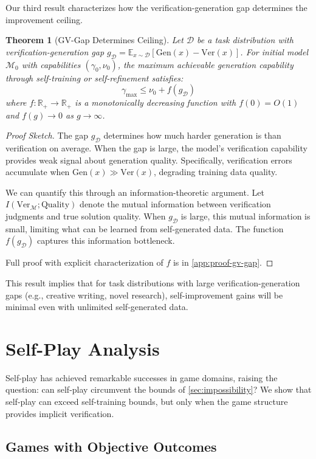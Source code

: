 \documentclass{article}
\newtheorem{theorem}{Theorem}
\theoremstyle{definition}
\theoremstyle{remark}
\newcommand{\M}{\mathcal{M}}  %
\newcommand{\D}{\mathcal{D}}  %
\newcommand{\Gen}{\text{Gen}}  %
\newcommand{\Ver}{\text{Ver}}  %
\newcommand{\E}{\mathbb{E}}    %
\newcommand{\R}{\mathbb{R}}    %
\begin{document}
Our third result characterizes how the verification-generation gap determines the improvement ceiling.

\begin{theorem}[GV-Gap Determines Ceiling]
\label{thm:gv-gap}
Let \(\D\) be a task distribution with verification-generation gap \(g_\D = \E_{x \sim \D}[\Gen(x) - \Ver(x)]\). For initial model \(\M_0\) with capabilities \((\gamma_0, \nu_0)\), the maximum achievable generation capability through self-training or self-refinement satisfies:
\[
\gamma_{\max} \leq \nu_0 + f(g_\D)
\]
where \(f : \R_+ \to \R_+\) is a monotonically decreasing function with \(f(0) = O(1)\) and \(f(g) \to 0\) as \(g \to \infty\).
\end{theorem}

\begin{proof}[Proof Sketch]
The gap \(g_\D\) determines how much harder generation is than verification on average. When the gap is large, the model's verification capability provides weak signal about generation quality. Specifically, verification errors accumulate when \(\Gen(x) \gg \Ver(x)\), degrading training data quality.

We can quantify this through an information-theoretic argument. Let \(I(\Ver_\M ; \text{Quality})\) denote the mutual information between verification judgments and true solution quality. When \(g_\D\) is large, this mutual information is small, limiting what can be learned from self-generated data. The function \(f(g_\D)\) captures this information bottleneck.

Full proof with explicit characterization of \(f\) is in \cref{app:proof-gv-gap}.
\end{proof}

This result implies that for task distributions with large verification-generation gaps (e.g., creative writing, novel research), self-improvement gains will be minimal even with unlimited self-generated data.

\section{Self-Play Analysis}
\label{sec:selfplay}

Self-play has achieved remarkable successes in game domains, raising the question: can self-play circumvent the bounds of \cref{sec:impossibility}? We show that self-play can exceed self-training bounds, but only when the game structure provides implicit verification.

\subsection{Games with Objective Outcomes}
\end{document}

